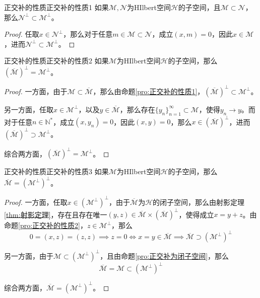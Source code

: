 \documentclass[lang = cn, scheme = chinese, thmcnt = section]{elegantbook}
\newcommand{\N}{\mathbb{N}}            %
\newcommand{\sub}{\subset}             %
\begin{document}
\begin{proposition}{正交补的性质}{正交补的性质1}
	如果$\mathcal{M}, \mathcal{N} $为HIlbert空间$\mathcal{H}$的子空间，且$\mathcal{M}\sub \mathcal{N} $，那么$ \mathcal{N} ^\perp\sub \mathcal{M}^\perp$。
\end{proposition}

\begin{proof}
	任取$x\in \mathcal{N}^\perp$，那么对于任意$m\in \mathcal{M}\sub \mathcal{N}$，成立$(x,m)=0$，因此$x\in \mathcal{M}$，进而$\mathcal{N} ^\perp\sub \mathcal{M}^\perp$。
\end{proof}

\begin{proposition}{正交补的性质}{正交补的性质2}
	如果$\mathcal{M}$为HIlbert空间$\mathcal{H}$的子空间，那么$(\overline{\mathcal{M}})^\perp=\mathcal{M}^\perp$。
\end{proposition}

\begin{proof}
	一方面，由于$\mathcal{M}\sub\overline{\mathcal{M}}$，那么由命题\ref{pro:正交补的性质1}，$(\overline{\mathcal{M}})^\perp\sub\mathcal{M}^\perp$。
	
	另一方面，任取$x\in \mathcal{M}^\perp$，以及$y\in \overline{\mathcal{M}}$，那么存在$\{y_n\}_{n=1}^{\infty}\sub\mathcal{M}$，使得$y_n\to y$。而对于任意$n\in\N^*$，成立$(x,y_n)=0$，因此$(x,y)=0$，那么$x\in (\overline{\mathcal{M}})^\perp$，进而$(\overline{\mathcal{M}})^\perp\supset\mathcal{M}^\perp$。
	
	综合两方面，$(\overline{\mathcal{M}})^\perp=\mathcal{M}^\perp$。
\end{proof}

\begin{proposition}{正交补的性质}{正交补的性质3}
	如果$\mathcal{M}$为HIlbert空间$\mathcal{H}$的子空间，那么$\overline{\mathcal{M}}=(\mathcal{M}^\perp)^\perp$。
\end{proposition}

\begin{proof}
	一方面，任取$x\in (\mathcal{M}^\perp)^\perp$，由于$\overline{\mathcal{M}}$为$\mathcal{H}$的闭子空间，那么由射影定理\ref{thm:射影定理}，存在且存在唯一$(y,z)\in\overline{\mathcal{M}}\times(\overline{\mathcal{M}})^\perp$，使得成立$x=y+z$。由命题\ref{pro:正交补的性质2}，$z\in \mathcal{M}^\perp$，那么
	$$
	0=(x,z)=(z,z)\implies z=0\iff x=y\in \overline{\mathcal{M}}\implies \overline{\mathcal{M}}\supset(\mathcal{M}^\perp)^\perp
	$$
	
	另一方面，由于$\mathcal{M}\sub (\mathcal{M}^\perp)^\perp$，且由命题\ref{pro:正交补为闭子空间}，那么
	$$
	\overline{\mathcal{M}}=\mathcal{M}\sub(\mathcal{M}^\perp)^\perp
	$$
	
	综合两方面，$\overline{\mathcal{M}}=(\mathcal{M}^\perp)^\perp$。
\end{proof}
\end{document}

